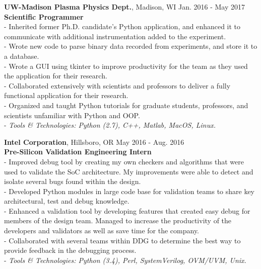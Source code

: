 \documentclass{resume}
\begin{document}
\begin{flushleft}
\textbf{UW-Madison Plasma Physics Dept.}, Madison, WI \hfill Jan. 2016 - May 2017 \\
\textbf{Scientific Programmer}\\
{\footnotesize
	\ttab- Inherited former Ph.D. candidate's Python application, and enhanced it to communicate with additional instrumentation
	\ttab added to the experiment. \\
	\ttab- Wrote new code to parse binary data recorded from experiments, and store it to a database. \\
	\ttab- Wrote a GUI using tkinter to improve productivity for the team as they used the application for their research. \\
	\ttab- Collaborated extensively with scientists and professors to deliver a fully functional application for their research. \\
	\ttab- Organized and taught Python tutorials for graduate students, professors, and scientists unfamiliar with Python and OOP. \\
	\ttab- \textit{Tools \& Technologies: Python (2.7), C++,  Matlab, MacOS, Linux.}\\[5mm]
}

\textbf{Intel Corporation}, Hillsboro, OR \hfill May 2016 - Aug. 2016\\
\textbf{Pre-Silicon Validation Engineering Intern}\\
{\footnotesize
\ttab- Improved debug tool by creating my own checkers and algorithms that were used to validate the SoC architecture. My \ttab improvements were able to detect and isolate several bugs found within the design.\\
\ttab- Developed Python modules in large code base for validation teams to share key architectural, test and debug knowledge. \\
\ttab- Enhanced a validation tool by developing features that created easy debug for members of the design team. Managed to \ttab increase the productivity of the developers and validators as well as save time for the company. \\
\ttab- Collaborated with several teams within DDG to determine the best way to provide feedback in the debugging process. \\
\ttab- \textit{Tools \& Technologies: Python (3.4), Perl, SystemVerilog, OVM/UVM, Unix.}\\[3mm]
}


\end{flushleft}
\end{document}

